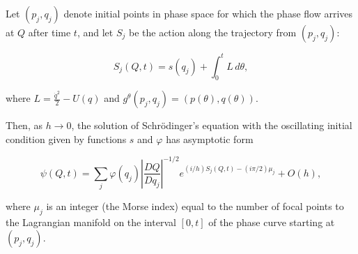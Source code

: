 Let $(p_j, q_j)$ denote initial points in phase space for which the phase flow arrives at $Q$ after time $t$, and let $S_j$ be the action along the trajectory from $(p_j, q_j)$:

$$S_j(Q, t) = s(q_j) + \int_0^t L \, d\theta,$$

where $L = \frac{\dot{q}^2}{2} - U(q)$ and $g^\theta(p_j, q_j) = (p(\theta), q(\theta))$.

Then, as $h \to 0$, the solution of Schrödinger's equation with the oscillating initial condition given by functions $s$ and $\varphi$ has asymptotic form

$$\psi(Q, t) = \sum_j \varphi(q_j) \left| \frac{DQ}{Dq_j} \right|^{-1/2} e^{(i/h)S_j(Q, t) - (i\pi/2)\mu_j} + O(h),$$

where $\mu_j$ is an integer (the Morse index) equal to the number of focal points to the Lagrangian manifold on the interval $[0, t]$ of the phase curve starting at $(p_j, q_j)$.
